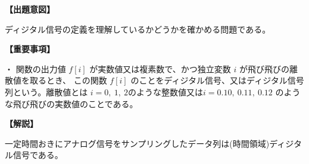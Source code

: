 \noindent \textbf{【出題意図】}

\noindent ディジタル信号の定義を理解しているかどうかを確かめる問題である。

\vspace{1em}
\noindent \textbf{【重要事項】}

\medskip
\noindent ・ 関数の出力値 $f[i]$ が実数値又は複素数で、かつ独立変数 $i$ が飛び飛びの離散値を取るとき、 この関数 $f[i]$ のことをディジタル信号、又はディジタル信号列という。離散値とは $i=0,\ 1,\ 2$のような整数値又は$i=0.10,\ 0.11,\ 0.12$ のような飛び飛びの実数値のことである。

\vspace{1em}
\noindent \textbf{【解説】}

\noindent 一定時間おきにアナログ信号をサンプリングしたデータ列は(時間領域)ディジタル信号である。
